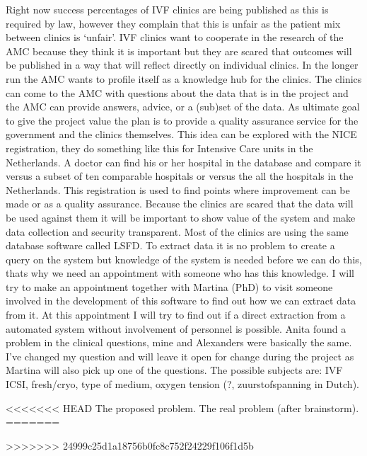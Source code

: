 



Right now success percentages of IVF clinics are being published as this is required by law, however they complain that this is unfair as the patient mix between clinics is ‘unfair’. 
IVF clinics want to cooperate in the research of the AMC because they think it is important but they are scared that outcomes will be published in a way that will reflect directly on individual clinics.
In the longer run the AMC wants to profile itself as a knowledge hub for the clinics. The clinics can come to the AMC with questions about the data that is in the project and the AMC can provide answers, advice, or a (sub)set of the data.
As ultimate goal to give the project value the plan is to provide a quality assurance service for the government and the clinics themselves.
This idea can be explored with the NICE registration, they do something like this for Intensive Care units in the Netherlands. 
A doctor can find his or her hospital in the database and compare it versus a subset of ten comparable hospitals or versus the all the hospitals in the Netherlands. 
This registration is used to find points where improvement can be made or as a quality assurance.
Because the clinics are scared that the data will be used against them it will be important to show value of the system and make data collection and security transparent.
Most of the clinics are using the same database software called LSFD. 
To extract data it is no problem to create a query on the system but knowledge of the system is needed before we can do this, thats why we need an appointment with someone who has this knowledge. 
I will try to make an appointment together with Martina (PhD) to visit someone involved in the development of this software to find out how we can extract data from it. 
At this appointment I will try to find out if a direct extraction from a automated system without involvement of personnel is possible.
Anita found a problem in the clinical questions, mine and Alexanders were basically the same. 
I’ve changed my question and will leave it open for change during the project as Martina will also pick up one of the questions. 
The possible subjects are: IVF ICSI, fresh/cryo, type of medium, oxygen tension (?, zuurstofspanning in Dutch).

<<<<<<< HEAD
The proposed problem.
The real problem (after brainstorm).
=======

>>>>>>> 24999c25d1a18756b0fc8c752f24229f106f1d5b
